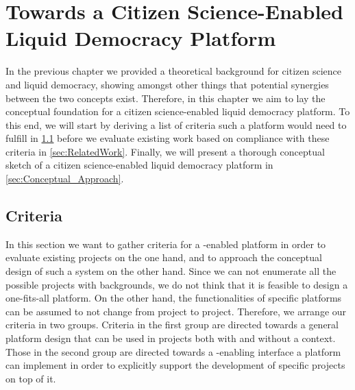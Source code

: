 \chapter{Towards a Citizen Science-Enabled Liquid Democracy Platform}
\label{ch:Approach}
In the previous chapter we provided a theoretical background for citizen science and liquid democracy, showing amongst other things that potential synergies between the two concepts exist.
Therefore, in this chapter we aim to lay the conceptual foundation for a citizen science-enabled liquid democracy platform.
To this end, we will start by deriving a list of criteria such a platform would need to fulfill in \ref{sec:Criteria} before we evaluate existing work based on compliance with these criteria in \ref{sec:RelatedWork}.
Finally, we will present a thorough conceptual sketch of a citizen science-enabled liquid democracy platform in \ref{sec:Conceptual_Approach}.


\section{Criteria}
\label{sec:Criteria}
In this section we want to gather criteria for a -enabled  platform in order to evaluate existing projects on the one hand, and to approach the conceptual design of such a system on the other hand. 
Since we can not enumerate all the possible  projects with  backgrounds, we do not think that it is feasible to design a one-fits-all platform.
On the other hand, the  functionalities of specific platforms can be assumed to not change from project to project.
Therefore, we arrange our criteria in two groups.
Criteria in the first group are directed towards a general  platform design that can be used in projects both with and without a  context.
Those in the second group are directed towards a -enabling interface a  platform can implement in order to explicitly support the development of specific  projects on top of it.

